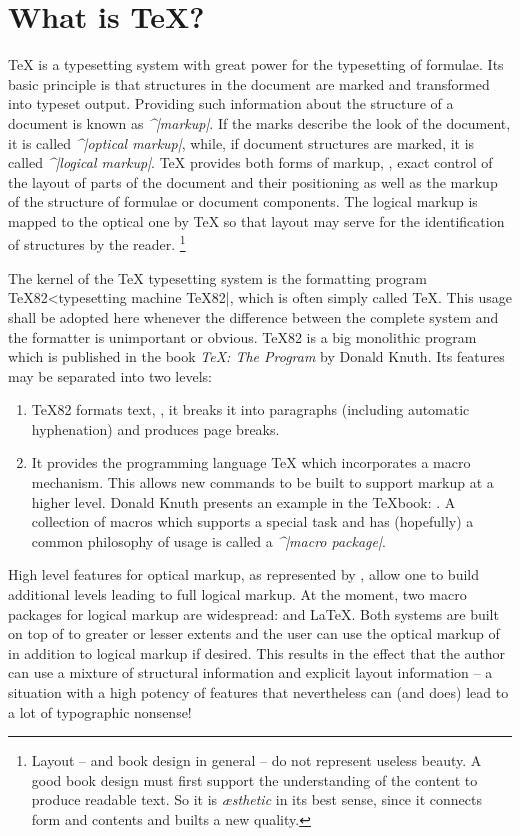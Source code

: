 \section{What is \TeX{}?}

 \TeX{} is a typesetting system with great power for the typesetting
of formulae. Its basic principle is that structures in the document
are marked and transformed into typeset output. Providing such
information about the structure of a document is known as {\it
^|markup|}. If the marks describe the look of the document, it is
called {\it ^|optical markup|}, while, if document structures are
marked, it is called {\it ^|logical markup|}. \TeX{}  provides both
forms of  markup, \ie{}, exact control of the layout of parts of the
document and their positioning as well as the markup of the structure
of formulae or document components. The logical markup is mapped to
the optical one by \TeX{} so that layout may serve for the
identification of structures by the reader.%
   \footnote{
      Layout -- and book design in general -- do not represent useless
beauty. A good book design must first support the understanding of
the content to produce readable text. So it is {\it
\ae{}sthetic\/} in its best sense, since it connects form and contents
and builts a new quality.
      }

 The kernel of the \TeX{} typesetting system is the formatting program
\TeX82^^|typesetting machine \TeX82|, which is often simply called
\TeX{}. This usage shall be adopted here whenever the difference
between the complete system and the formatter is unimportant or
obvious. \TeX82 is a big monolithic program which is published in the
book {\it \TeX{}: The Program\/} by {\sc Donald Knuth}. Its features
may be separated into two levels:
 \begin{enumerate}

\item \TeX82 formats text, \ie{}, it breaks it into paragraphs
(including automatic hyphenation) and produces page breaks.

\item It provides the programming language \TeX{} which incorporates a macro
mechanism. This allows new commands to be built to support markup
at a higher level. {\sc Donald Knuth} presents an example in the
\TeX{}book: \Plain{}. A collection of macros which supports a special
task and has (hopefully) a common philosophy of usage is called a
{\it ^|macro package|}.

\end{enumerate}
 High level features for optical markup, as represented by \Plain{},
allow one to build additional levels leading to full logical markup.
At the moment, two macro packages for logical markup are widespread:
\AmSTeX{} and \LaTeX{}. Both systems are built on top of \Plain{} to
greater or lesser extents and the user can use the optical markup of
\Plain{} in addition to logical markup if desired. This results in
the effect that the author can use a mixture of structural
information and explicit layout information -- a situation with a
high potency of features that nevertheless can (and does) lead to a
lot of typographic nonsense!

